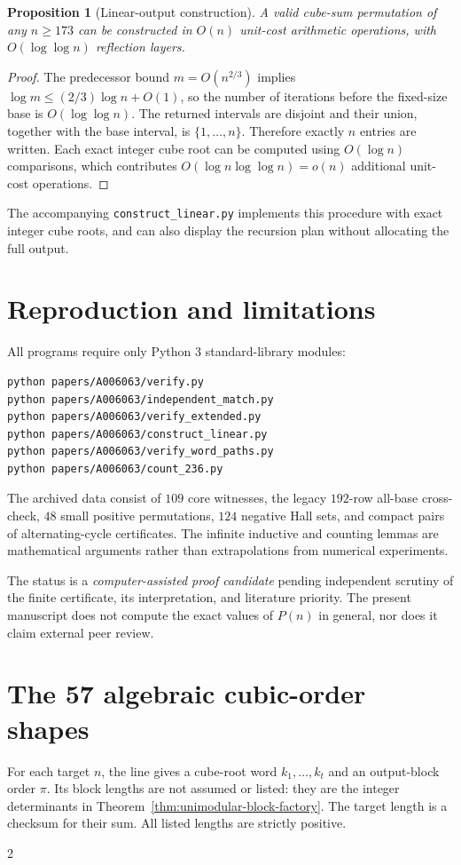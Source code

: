 \documentclass[10pt]{article}
\newtheorem{proposition}{Proposition}
\begin{document}
\begin{proposition}[Linear-output construction]
A valid cube-sum permutation of any $n\ge173$ can be
constructed in $O(n)$ unit-cost arithmetic operations,
with $O(\log\log n)$ reflection layers.
\end{proposition}
\begin{proof}
The predecessor bound $m=O(n^{2/3})$ implies
$\log m\le(2/3)\log n+O(1)$, so the number of
iterations before the fixed-size base is
$O(\log\log n)$. The returned intervals are disjoint
and their union, together with the base interval,
is $\{1,\dots,n\}$. Therefore exactly $n$ entries
are written. Each exact integer cube root can
be computed using $O(\log n)$ comparisons,
which contributes $O(\log n\log\log n)=o(n)$
additional unit-cost operations.
\end{proof}
The accompanying \texttt{construct\_linear.py}
implements this procedure with exact integer
cube roots, and can also display the recursion
plan without allocating the full output.

\section{Reproduction and limitations}
All programs require only Python 3 standard-library modules:
\begin{verbatim}
python papers/A006063/verify.py
python papers/A006063/independent_match.py
python papers/A006063/verify_extended.py
python papers/A006063/construct_linear.py
python papers/A006063/verify_word_paths.py
python papers/A006063/count_236.py
\end{verbatim}
The archived data consist of $109$ core witnesses,
the legacy $192$-row all-base cross-check, $48$ small
positive permutations, $124$ negative Hall sets,
and compact pairs of alternating-cycle certificates.
The infinite inductive and counting lemmas are
mathematical arguments rather than extrapolations
from numerical experiments.

The status is a \emph{computer-assisted proof candidate}
pending independent scrutiny of the finite certificate,
its interpretation, and literature priority.
The present manuscript does not compute the exact values
of $P(n)$ in general, nor does it claim external peer review.


\clearpage
\appendix

\clearpage
\section{The 57 algebraic cubic-order shapes}
\label{app:algebraic-shapes}
For each target $n$, the line gives a cube-root
word $k_1,\ldots,k_t$ and an output-block order
$\pi$. Its block lengths are not assumed or
listed: they are the integer determinants
in Theorem~\ref{thm:unimodular-block-factory}.
The target length is a checksum for their sum.
All listed lengths are strictly positive.
\begin{multicols}{2}
\scriptsize
\setlength{\parindent}{0pt}
\setlength{\parskip}{2pt}

\end{multicols}
\end{document}
